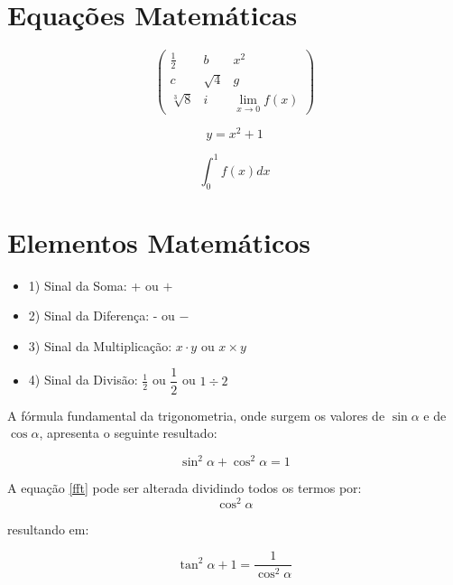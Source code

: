 \documentclass[12pt,a4paper]{article}
\begin{document}
\section{Equações Matemáticas}
\begin{center}
$$
\left(\begin{array}{ccc}
    \frac{1}{2}     &       b       &   x^2\\
    c               &   \sqrt{4}    &   g\\
    \sqrt[3]{8}     &       i       &   \displaystyle\lim_{x\rightarrow 0}f(x)
\end{array}\right)
$$
\end{center}


\begin{equation}
    y=x^2+1
\end{equation}

\begin{equation}
    \displaystyle\int_0^1 f(x)dx
\end{equation}


\section{Elementos Matemáticos}

\begin{itemize} %
    \item [] 1) Sinal da Soma: + ou $+$
    \item [] 2) Sinal da Diferença: - ou $-$
    \item [] 3) Sinal da Multiplicação: $x\cdot y$ ou $x\times y$
    \item [] 4) Sinal da Divisão: $\frac{1}{2}$ ou $\dfrac{1}{2}$ ou $1\div 2$
\end{itemize}


\vspace{2cm}
A fórmula fundamental da trigonometria, onde surgem os valores de $\sin \alpha$ e de $\cos \alpha$, apresenta o seguinte resultado:

\begin{equation}
    \sin^2 \alpha + \cos^2 \alpha =1
    \label{fft}
\end{equation}

A equação \ref{fft} pode ser alterada dividindo todos os termos por:
\[\cos^2 \alpha\]

resultando em:

$$
\tan^2 \alpha +1 = \frac{1}{\cos^2\alpha}
$$

 
\end{document}
